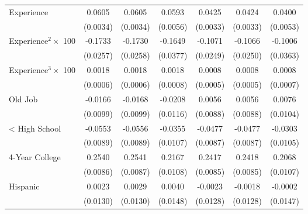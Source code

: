 {\begin{longtable}{l*{6}{c}}
Experience          &      0.0605\sym{***}&      0.0605\sym{***}&      0.0593\sym{***}&      0.0425\sym{***}&      0.0424\sym{***}&      0.0400\sym{***}\\
                    &    (0.0034)         &    (0.0034)         &    (0.0056)         &    (0.0033)         &    (0.0033)         &    (0.0053)         \\
Experience$^2\times$ 100&     -0.1733\sym{***}&     -0.1730\sym{***}&     -0.1649\sym{***}&     -0.1071\sym{***}&     -0.1066\sym{***}&     -0.1006\sym{***}\\
                    &    (0.0257)         &    (0.0258)         &    (0.0377)         &    (0.0249)         &    (0.0250)         &    (0.0363)         \\
Experience$^3\times$ 100&      0.0018\sym{***}&      0.0018\sym{***}&      0.0018\sym{**} &      0.0008         &      0.0008         &      0.0008         \\
                    &    (0.0006)         &    (0.0006)         &    (0.0008)         &    (0.0005)         &    (0.0005)         &    (0.0007)         \\
Old Job             &     -0.0166\sym{*}  &     -0.0168\sym{*}  &     -0.0208\sym{*}  &      0.0056         &      0.0056         &      0.0076         \\
                    &    (0.0099)         &    (0.0099)         &    (0.0116)         &    (0.0088)         &    (0.0088)         &    (0.0104)         \\
< High School       &     -0.0553\sym{***}&     -0.0556\sym{***}&     -0.0355\sym{***}&     -0.0477\sym{***}&     -0.0477\sym{***}&     -0.0303\sym{***}\\
                    &    (0.0089)         &    (0.0089)         &    (0.0107)         &    (0.0087)         &    (0.0087)         &    (0.0105)         \\
4-Year College      &      0.2540\sym{***}&      0.2541\sym{***}&      0.2167\sym{***}&      0.2417\sym{***}&      0.2418\sym{***}&      0.2068\sym{***}\\
                    &    (0.0086)         &    (0.0087)         &    (0.0108)         &    (0.0085)         &    (0.0085)         &    (0.0107)         \\
Hispanic            &      0.0023         &      0.0029         &      0.0040         &     -0.0023         &     -0.0018         &     -0.0002         \\
                    &    (0.0130)         &    (0.0130)         &    (0.0148)         &    (0.0128)         &    (0.0128)         &    (0.0147)         \\

\end{longtable}}
